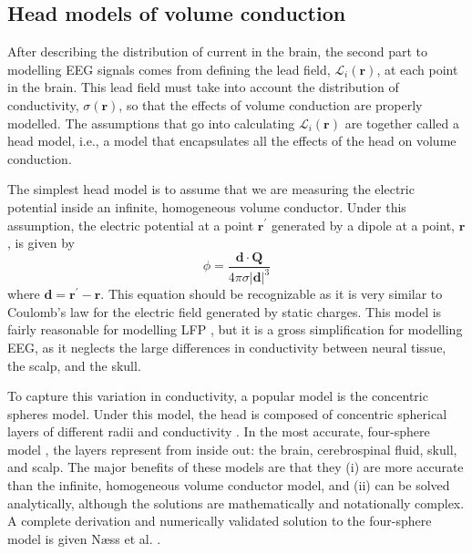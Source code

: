 \subsection{Head models of volume conduction} \label{sec:head_models}
After describing the distribution of current in the brain, the second part to modelling EEG signals comes from defining the lead field, $\mathcal{L}_i(\bm{r})$, at each point in the brain. This lead field must take into account the distribution of conductivity, $\sigma(\bm{r})$, so that the effects of volume conduction are properly modelled. The assumptions that go into calculating $\mathcal{L}_i(\bm{r})$ are together called a head model, i.e., a model that encapsulates all the effects of the head on volume conduction.

The simplest head model is to assume that we are measuring the electric potential inside an infinite, homogeneous volume conductor. Under this assumption, the electric potential at a point $\bm{r}^\prime$ generated by a dipole at a point, $\bm{r}$, is given by
\begin{equation}
    \phi = \frac{\bm{d} \cdot \bm{Q}}{4\pi\sigma |\bm{d}|^3}
\end{equation}
where $\bm{d}=\bm{r}^\prime-\bm{r}$. This equation should be recognizable as it is very similar to Coulomb's law for the electric field generated by static charges. This model is fairly reasonable for modelling LFP \cite{Pettersen2012}, but it is a gross simplification for modelling EEG, as it neglects the large differences in conductivity between neural tissue, the scalp, and the skull.

To capture this variation in conductivity, a popular model is the concentric spheres model. Under this model, the head is composed of concentric spherical layers of different radii and conductivity \cite{Geisler1961}. In the most accurate, four-sphere model \cite{Hosek1978}, the layers represent from inside out: the brain, cerebrospinal fluid, skull, and scalp. The major benefits of these models are that they (i) are more accurate than the infinite, homogeneous volume conductor model, and (ii) can be solved analytically, although the solutions are mathematically and notationally complex. A complete derivation and numerically validated solution to the four-sphere model is given Næss et al. \cite{Næss2017}.

